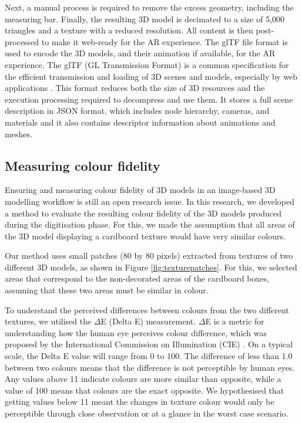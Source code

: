 \documentclass[acmlarge,screen,dvipsnames]{acmart}
\begin{document}
Next, a manual process is required to remove the excess geometry,
including the measuring bar. Finally, the resulting 3D model is
decimated to a size of 5,000 triangles and a texture with a reduced
resolution. All content is then post-processed to make it
web-ready for the AR experience.
The glTF file format is used to encode the 3D models, and their animation if available, for the AR
experience. The glTF (GL Transmission Format) is a common specification for
the efficient transmission and loading of 3D scenes and models,
especially by web applications \cite{khronos}. This format reduces both the size
of 3D resources and the execution processing required to decompress and
use them. It stores a full scene description in JSON format, which
includes node hierarchy, cameras, and materials and it also contains
descriptor information about animations and meshes.


\subsection{Measuring colour fidelity} 
Ensuring and measuring colour
fidelity of 3D models in an image-based 3D modelling workflow is still an
open research issue. In this research, we developed a method to evaluate the
resulting colour fidelity of the 3D models produced during the
digitisation phase. For this, we made the assumption that all areas of
the 3D model displaying a cardboard texture would have very similar
colours.

Our method uses small patches (80 by 80 pixels) extracted from
textures of two different 3D models, as shown in Figure
\ref{fig:texturepatches}. For this, we selected areas that correspond to the
non-decorated areas of the cardboard boxes, assuming that these two areas
must be similar in colour. 


To understand the perceived differences between colours from the two different textures, we utilised the $\Delta$E (Delta E) measurement. $\Delta$E is a metric for understanding how the human eye perceives
colour difference, which was proposed by the International Commission on
Illumination (CIE) \cite{cie2020}. On a typical scale, the Delta E value will range
from 0 to 100. The difference of less than 1.0 between two colours means
that the difference is not perceptible by human eyes. Any values above
11 indicate colours are more similar than opposite, while a value of 100
means that colours are the exact opposite. We hypothesised that getting
values below 11 meant the changes in texture colour would only be
perceptible through close observation or at a glance in the worst
case scenario.
\end{document}
